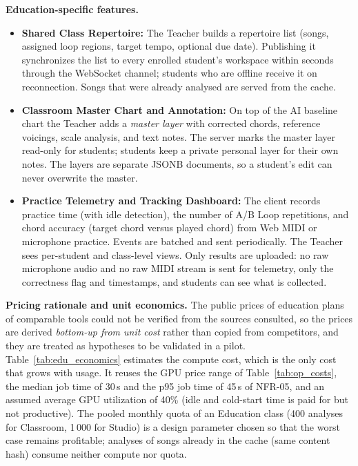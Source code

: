 \documentclass[a4paper]{article}
\begin{document}
\textbf{Education-specific features.}
\begin{itemize}
    \item \textbf{Shared Class Repertoire:} The Teacher builds a repertoire list (songs, assigned loop regions, target tempo, optional due date). Publishing it synchronizes the list to every enrolled student's workspace within seconds through the WebSocket channel; students who are offline receive it on reconnection. Songs that were already analysed are served from the cache.
    \item \textbf{Classroom Master Chart and Annotation:} On top of the AI baseline chart the Teacher adds a \emph{master layer} with corrected chords, reference voicings, scale analysis, and text notes. The server marks the master layer read-only for students; students keep a private personal layer for their own notes. The layers are separate JSONB documents, so a student's edit can never overwrite the master.
    \item \textbf{Practice Telemetry and Tracking Dashboard:} The client records practice time (with idle detection), the number of A/B Loop repetitions, and chord accuracy (target chord versus played chord) from Web MIDI or microphone practice. Events are batched and sent periodically. The Teacher sees per-student and class-level views. Only results are uploaded: no raw microphone audio and no raw MIDI stream is sent for telemetry, only the correctness flag and timestamps, and students can see what is collected.
\end{itemize}

\textbf{Pricing rationale and unit economics.} The public prices of education plans of comparable tools could not be verified from the sources consulted, so the prices are derived \emph{bottom-up from unit cost} rather than copied from competitors, and they are treated as hypotheses to be validated in a pilot. Table~\ref{tab:edu_economics} estimates the compute cost, which is the only cost that grows with usage. It reuses the GPU price range of Table~\ref{tab:op_costs}, the median job time of 30\,s and the p95 job time of 45\,s of NFR-05, and an assumed average GPU utilization of 40\% (idle and cold-start time is paid for but not productive). The pooled monthly quota of an Education class (400 analyses for Classroom, 1\,000 for Studio) is a design parameter chosen so that the worst case remains profitable; analyses of songs already in the cache (same content hash) consume neither compute nor quota.
\end{document}
